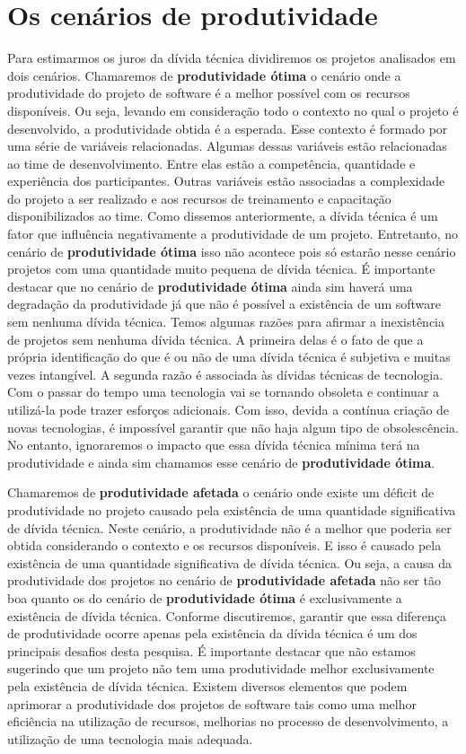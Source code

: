 \section{Os cenários de produtividade}


Para estimarmos os juros da dívida técnica dividiremos os projetos analisados em dois cenários. Chamaremos de \textbf{produtividade ótima} o cenário onde a produtividade do projeto  de software é a melhor possível com os recursos disponíveis. Ou seja, levando em consideração todo o contexto no qual o projeto é desenvolvido, a produtividade obtida é a esperada. Esse contexto é formado por uma série de variáveis relacionadas.  Algumas dessas variáveis estão relacionadas ao time de desenvolvimento. Entre elas estão a competência, quantidade e experiência dos participantes. Outras variáveis estão associadas a complexidade do projeto a ser realizado e aos recursos de treinamento e capacitação disponibilizados ao time. Como dissemos anteriormente, a dívida técnica é um fator que influência negativamente a produtividade de um projeto. Entretanto,  no cenário de \textbf{produtividade ótima} isso não acontece pois só estarão nesse cenário projetos com uma quantidade muito pequena de dívida técnica.  É importante destacar que no cenário  de \textbf{produtividade ótima} ainda sim haverá uma degradação da produtividade já que não é possível a existência de um software sem nenhuma dívida técnica. Temos algumas razões para afirmar a inexistência de projetos sem nenhuma dívida técnica. A primeira delas é o fato de que a própria identificação do que é ou não de uma dívida técnica é subjetiva e muitas vezes intangível. A segunda razão é associada às dívidas técnicas de tecnologia. Com o passar do tempo uma tecnologia vai se tornando obsoleta e continuar a utilizá-la pode trazer esforços adicionais. Com isso, devida a contínua criação de novas tecnologias, é impossível garantir que não haja algum tipo de obsolescência. No entanto, ignoraremos o impacto que essa dívida técnica mínima terá na produtividade e ainda sim chamamos esse cenário de \textbf{produtividade ótima}.




Chamaremos de \textbf{produtividade afetada} o cenário onde existe um déficit de produtividade no projeto causado pela existência de uma quantidade significativa de dívida técnica. Neste cenário, a produtividade não é a melhor que poderia ser obtida considerando o contexto e os recursos disponíveis. E isso é causado pela existência de uma quantidade significativa de dívida técnica. Ou seja, a causa da  produtividade dos projetos  no cenário de \textbf{produtividade afetada} não ser tão boa quanto os do cenário de  \textbf{produtividade ótima} é exclusivamente a existência de dívida técnica.  Conforme discutiremos, garantir que essa diferença de produtividade ocorre apenas pela existência da dívida técnica é um dos principais desafios desta pesquisa. É importante destacar que não estamos sugerindo que um projeto não tem uma produtividade melhor exclusivamente pela existência de dívida técnica. Existem diversos elementos que podem aprimorar a produtividade dos projetos de software tais como uma melhor eficiência na utilização de recursos, melhorias no processo de desenvolvimento, a utilização de uma tecnologia mais adequada. 


